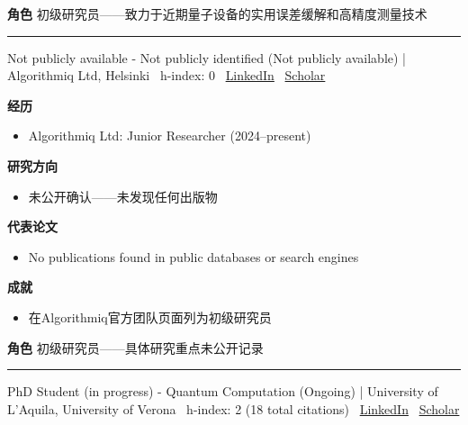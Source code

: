 \par{\footnotesize\color{mainred}\textbf{角色}} {\footnotesize 初级研究员——致力于近期量子设备的实用误差缓解和高精度测量技术}
\vspace{2pt}\hrule\vspace{2pt}
\vspace{4pt}
\par{\footnotesize\color{graytext}Not publicly available - Not publicly identified (Not publicly available) | Algorithmiq Ltd, Helsinki \textbar\  h-index: 0 \textbar\  \href{https://www.linkedin.com/in/francesco-grieco-58212a346/}{LinkedIn} \textbar\  \href{Not found}{Scholar}}
\par{\footnotesize\color{mainred}\textbf{经历}}
\begin{itemize}[leftmargin=1.2em,itemsep=0pt,topsep=0pt]
\item {\footnotesize Algorithmiq Ltd: Junior Researcher (2024–present)}
\end{itemize}
\par{\footnotesize\color{mainred}\textbf{研究方向}}
\begin{itemize}[leftmargin=1.2em,itemsep=0pt,topsep=0pt]
\item {\footnotesize 未公开确认——未发现任何出版物}
\end{itemize}
\par{\footnotesize\color{mainred}\textbf{代表论文}}
\begin{itemize}[leftmargin=1.2em,itemsep=0pt,topsep=0pt]
\item {\footnotesize No publications found in public databases or search engines}
\end{itemize}
\par{\footnotesize\color{mainred}\textbf{成就}}
\begin{itemize}[leftmargin=1.2em,itemsep=0pt,topsep=0pt]
\item {\footnotesize 在Algorithmiq官方团队页面列为初级研究员}
\end{itemize}
\par{\footnotesize\color{mainred}\textbf{角色}} {\footnotesize 初级研究员——具体研究重点未公开记录}
\vspace{2pt}\hrule\vspace{2pt}
\vspace{4pt}
\par{\footnotesize\color{graytext}PhD Student (in progress) - Quantum Computation (Ongoing) | University of L'Aquila, University of Verona \textbar\  h-index: 2 (18 total citations) \textbar\  \href{https://www.linkedin.com/in/quantumfabiotarocco/}{LinkedIn} \textbar\  \href{Not publicly indexed; AD Scientific Index profile available at https://adscientificindex.com/scientist/fabio-tarocco/5178248}{Scholar}}
